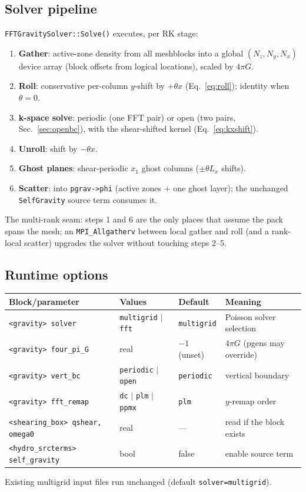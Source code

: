 \documentclass[11pt]{article}
\newcommand{\code}[1]{\texttt{#1}}
\begin{document}
\subsection{Solver pipeline}
\code{FFTGravitySolver::Solve()} executes, per RK stage:
\begin{enumerate}
  \item \textbf{Gather}: active-zone density from all meshblocks into a global
        $(N_z,N_y,N_x)$ device array (block offsets from logical locations),
        scaled by $4\pi G$.
  \item \textbf{Roll}: conservative per-column $y$-shift by $+\theta x$
        (Eq.~\ref{eq:roll}); identity when $\theta=0$.
  \item \textbf{k-space solve}: periodic (one FFT pair) or open (two pairs,
        Sec.~\ref{sec:openbc}), with the shear-shifted kernel
        (Eq.~\ref{eq:kxshift}).
  \item \textbf{Unroll}: shift by $-\theta x$.
  \item \textbf{Ghost planes}: shear-periodic $x_1$ ghost columns
        ($\pm\theta L_x$ shifts).
  \item \textbf{Scatter}: into \code{pgrav->phi} (active zones + one ghost layer);
        the unchanged \code{SelfGravity} source term consumes it.
\end{enumerate}
The multi-rank seam: steps 1 and 6 are the only places that assume the pack spans
the mesh; an \code{MPI\_Allgatherv} between local gather and roll (and a rank-local
scatter) upgrades the solver without touching steps 2--5.

\subsection{Runtime options}
\begin{center}
\begin{tabular}{@{}llll@{}}
\toprule
Block/parameter & Values & Default & Meaning \\
\midrule
\code{<gravity> solver} & \code{multigrid} $|$ \code{fft} & \code{multigrid} & Poisson solver selection \\
\code{<gravity> four\_pi\_G} & real & $-1$ (unset) & $4\pi G$ (pgens may override) \\
\code{<gravity> vert\_bc} & \code{periodic} $|$ \code{open} & \code{periodic} & vertical boundary \\
\code{<gravity> fft\_remap} & \code{dc} $|$ \code{plm} $|$ \code{ppmx} & \code{plm} & $y$-remap order \\
\code{<shearing\_box> qshear, omega0} & real & --- & read if the block exists \\
\code{<hydro\_srcterms> self\_gravity} & bool & false & enable source term \\
\bottomrule
\end{tabular}
\end{center}
Existing multigrid input files run unchanged (default \code{solver=multigrid}).
\end{document}
